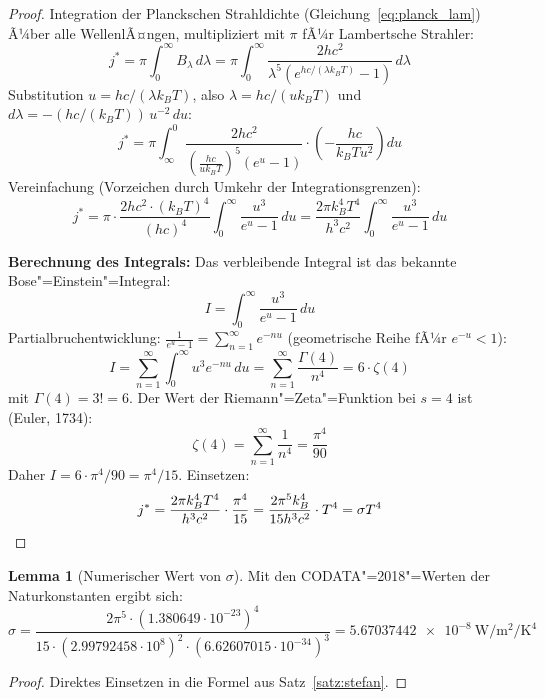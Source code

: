 ﻿\documentclass[a4paper,12pt]{article}
\theoremstyle{definition}
\newtheorem{lemma}{Lemma}
\begin{document}
\begin{proof}
    Integration der Planckschen Strahldichte (Gleichung~\eqref{eq:planck_lam})
    Ã¼ber alle WellenlÃ¤ngen, multipliziert mit $\pi$ fÃ¼r Lambertsche Strahler:
    \[
        j^* = \pi \int_0^\infty B_\lambda\,d\lambda
        = \pi \int_0^\infty \frac{2hc^2}{\lambda^5(e^{hc/(\lambda k_BT)}-1)}\,d\lambda
    \]
    Substitution $u = hc/(\lambda k_B T)$, also
    $\lambda = hc/(u k_B T)$ und $d\lambda = -(hc/(k_BT))\,u^{-2}\,du$:
    \[
        j^* = \pi \int_\infty^0
        \frac{2hc^2}{\left(\tfrac{hc}{uk_BT}\right)^5 (e^u - 1)}
        \cdot \left(-\frac{hc}{k_BT u^2}\right) du
    \]
    Vereinfachung (Vorzeichen durch Umkehr der Integrationsgrenzen):
    \[
        j^* = \pi \cdot \frac{2hc^2 \cdot (k_BT)^4}{(hc)^4}
        \int_0^\infty \frac{u^3}{e^u-1}\,du
        = \frac{2\pi k_B^4 T^4}{h^3 c^2} \int_0^\infty \frac{u^3}{e^u-1}\,du
    \]

    \textbf{Berechnung des Integrals:}
    Das verbleibende Integral ist das bekannte Bose"=Einstein"=Integral:
    \[
        I = \int_0^\infty \frac{u^3}{e^u-1}\,du
    \]
    Partialbruchentwicklung: $\frac{1}{e^u-1} = \sum_{n=1}^\infty e^{-nu}$
    (geometrische Reihe fÃ¼r $e^{-u} < 1$):
    \[
        I = \sum_{n=1}^\infty \int_0^\infty u^3 e^{-nu}\,du
        = \sum_{n=1}^\infty \frac{\Gamma(4)}{n^4}
        = 6 \cdot \zeta(4)
    \]
    mit $\Gamma(4) = 3! = 6$. Der Wert der Riemann"=Zeta"=Funktion bei $s=4$
    ist (Euler, 1734):
    \[
        \zeta(4) = \sum_{n=1}^\infty \frac{1}{n^4} = \frac{\pi^4}{90}
    \]
    Daher $I = 6 \cdot \pi^4/90 = \pi^4/15$. Einsetzen:
    \[
        j^* = \frac{2\pi k_B^4 T^4}{h^3 c^2} \cdot \frac{\pi^4}{15}
        = \frac{2\pi^5 k_B^4}{15 h^3 c^2} \cdot T^4 = \sigma T^4 \qedhere
    \]
\end{proof}

\begin{lemma}[Numerischer Wert von $\sigma$]
    Mit den CODATA"=2018"=Werten der Naturkonstanten ergibt sich:
    \[
        \sigma = \frac{2\pi^5 \cdot (1.380649\cdot10^{-23})^4}
                      {15 \cdot (2.99792458\cdot10^8)^2 \cdot (6.62607015\cdot10^{-34})^3}
        = \SI{5.67037442e-8}{\watt\per\metre\squared\per\kelvin\tothe{4}}
    \]
\end{lemma}

\begin{proof}
    Direktes Einsetzen in die Formel aus Satz~\ref{satz:stefan}. \qedhere
\end{proof}
\end{document}
